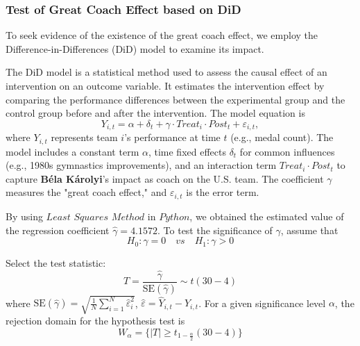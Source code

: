 \documentclass{mcmthesis}
\begin{document}
\subsubsection{Test of Great Coach Effect based on DiD}

To seek evidence of the existence of the great coach effect, we employ the Difference-in-Differences (DiD) model to examine its impact.

The DiD model is a statistical method used to assess the causal effect of an intervention on an outcome variable. It estimates the intervention effect by comparing the performance differences between the experimental group and the control group before and after the intervention. The model equation is 
\begin{equation}
	Y_{i,t}=\alpha+\delta_t+\gamma \cdot Treat_i \cdot Post_t + \varepsilon_{i,t},
\end{equation}
where \( Y_{i,t} \) represents team \( i \)'s performance at time \( t \) (e.g., medal count). The model includes a constant term \(\alpha\), time fixed effects \(\delta_t\) for common influences (e.g., 1980s gymnastics improvements), and an interaction term \( Treat_i \cdot Post_t \) to capture \textbf{Béla Károlyi}'s impact as coach on the U.S. team. The coefficient \(\gamma\) measures the "great coach effect," and \(\varepsilon_{i,t}\) is the error term.

By using $Least$ $Squares$ $Method$ in $Python$, we obtained the estimated value of the regression coefficient $\hat{\gamma}=4.1572$. To test the significance of $\gamma$, assume that
\begin{equation*}
	H_0: \gamma=0 \quad vs \quad H_1: \gamma>0
\end{equation*}

Select the test statistic:
\begin{equation}
	T=\frac{ \hat{\gamma} }{ \text{SE}(\hat{\gamma}) } \sim t(30-4)
\end{equation}
where $\text{SE}(\hat{\gamma}) = \sqrt{ \frac{1}{N} \sum_{i=1}^{N} \hat{\varepsilon}_i^2 }$, $\hat{\varepsilon}=\hat{Y}_{i,t}-Y_{i,t}$. For a given significance level $\alpha$, the rejection domain for the hypothesis test is
\begin{equation}
	W_\alpha = \big\{ |T| \ge t_{1-\frac{\alpha}{2}}(30-4) \big\}
\end{equation}
\end{document}

